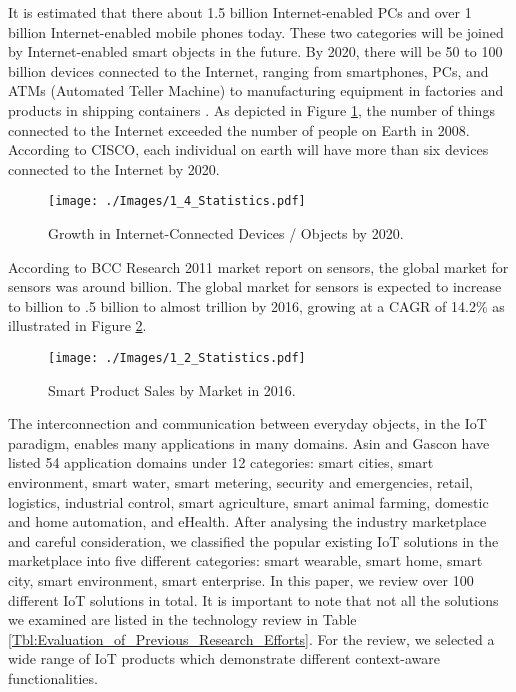 \documentclass[journal]{IEEEtran}
\begin{document}
It is estimated that there about 1.5 billion Internet-enabled PCs and over 1 billion Internet-enabled  mobile phones  today. These two categories  will  be joined by Internet-enabled smart objects \cite{P041, TII07}  in the future. By 2020, there will  be 50 to 100 billion devices connected to the Internet, ranging from smartphones, PCs, and ATMs (Automated Teller Machine) to manufacturing equipment in factories and products in shipping containers  \cite{ZMP008}. As depicted in Figure \ref{Figure:Statistics3}, the number of things connected to the Internet exceeded the number of people on Earth in 2008. According to CISCO, each individual on earth will have more than six devices connected to the Internet by 2020.



\begin{figure}[!h]
 \centering
\texttt{[image: ./Images/1\_4\_Statistics.pdf]}
\caption{Growth in Internet-Connected Devices / Objects by 2020.}
\label{Figure:Statistics3}	
\end{figure}






According to BCC Research 2011 market report on sensors, the global market for sensors was around  billion. The global market for sensors is expected to increase to \3 billion to \6.5 billion to almost \1 trillion by 2016, growing at a CAGR of 14.2\% as illustrated in Figure \ref{Figure:Statistics1}. 



\begin{figure}[!h]
 \centering
\texttt{[image: ./Images/1\_2\_Statistics.pdf]}
\caption{Smart Product Sales by Market in 2016.}
 \label{Figure:Statistics1}	
\end{figure}






The interconnection and communication between everyday objects, in the IoT paradigm, enables many applications in many domains. Asin and Gascon \cite{WaspMote} have listed 54 application domains under 12 categories: smart cities, smart environment, smart water, smart metering, security and emergencies, retail, logistics, industrial control, smart agriculture, smart animal farming, domestic and home automation, and eHealth. After analysing the industry marketplace and careful consideration, we classified the popular existing IoT solutions in the marketplace into five different categories: smart wearable, smart home, smart city, smart environment, smart enterprise. In this paper, we review  over 100 different IoT solutions in total. It is important to note that not all the solutions we examined are listed in the technology review in Table \ref{Tbl:Evaluation_of_Previous_Research_Efforts}. For the review, we selected a wide range of IoT products which demonstrate different context-aware functionalities.
\end{document}
